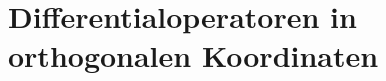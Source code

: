 %
%
%
%
\chapter{Differentialoperatoren in orthogonalen Koordinaten\label{chapter:diffortho}}
\begin{refsection}





\printbibliography[heading=subbibliography]
\end{refsection}
